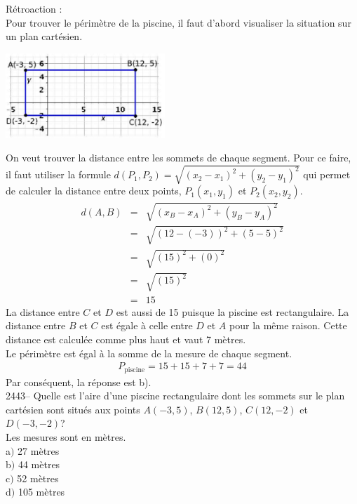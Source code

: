 \documentclass[letterpaper, 12pt]{article}
\begin{document}
R\'etroaction :\\
Pour trouver le p\'erim\`etre de la piscine, il faut d'abord visualiser la situation sur un plan cart\'esien. \\
\begin{center}
 \includegraphics[width=6cm,bb=14 14 415 225]{Q2442.eps}
\end{center}
On veut trouver la distance entre les sommets de chaque segment. Pour ce faire, il faut utiliser la formule $d(P_{1}, P_{2})=\sqrt{(x_{2}-x_{1})^{2}+(y_{2}-y_{1})^{2}}$ qui permet de calculer la distance entre deux points, $P_{1}(x_{1},y_{1})$ et $P_{2}(x_{2},y_{2})$.
\begin{eqnarray*}
 d(A, B)&=&\sqrt{(x_{B}-x_{A})^{2}+(y_{B}-y_{A})^{2}}\\
&=&\sqrt{(12-(-3))^{2}+(5-5)^{2}}\\
&=&\sqrt{(15)^{2}+(0)^{2}}\\
&=&\sqrt{(15)^{2}}\\
&=&15
\end{eqnarray*}
La distance entre $C$ et $D$ est aussi de 15 puisque la piscine est rectangulaire. La distance entre $B$ et $C$ est \'egale \`a celle entre $D$ et $A$ pour la m\^eme raison. Cette distance est calcul\'ee comme plus haut et vaut 7 m\`etres.\\
Le p\'erim\`etre est \'egal \`a la somme de la mesure de chaque segment.
\begin{eqnarray*}
 P_{\textrm{piscine}}=15+15+7+7=44
\end{eqnarray*}
Par cons\'equent, la r\'eponse est b).\\

2443-- Quelle est l'aire d'une piscine rectangulaire dont les sommets sur le plan cart\'esien sont situ\'es aux points $A(-3, 5)$, $B(12, 5)$, $C(12, -2)$ et $D(-3, -2)$?\\
Les mesures sont en m\`etres.\\

a$)$ 27 m\`etres\\
b$)$ 44 m\`etres\\
c$)$ 52 m\`etres\\
d$)$ 105 m\`etres\\
\end{document}

